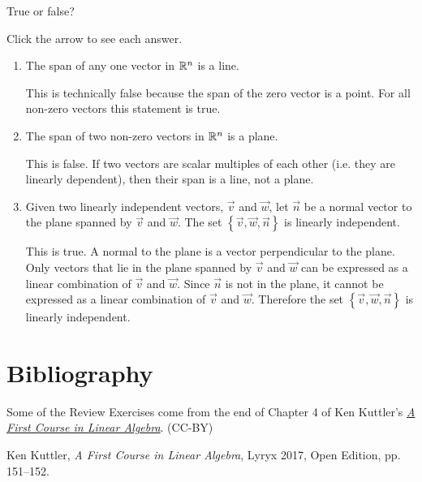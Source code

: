 \documentclass{ximera}
\begin{document}
\begin{problem}\label{prob:solvedCh2_3}
    True or false?

    Click the arrow to see each answer.

    \begin{enumerate}
        \item The span of any one vector in $\mathbb{R}^n$ is a line.

        \begin{expandable}
            This is technically false because the span of the zero vector is a point.  For all non-zero vectors this statement is true.
        \end{expandable}

        \item The span of two non-zero vectors in $\mathbb{R}^n$ is a plane.

        \begin{expandable}
            This is false.  If two vectors are scalar multiples of each other (i.e. they are linearly dependent), then their span is a line, not a plane.
        \end{expandable}

        \item Given two linearly independent vectors, $\vec{v}$ and $\vec{w}$, let $\vec{n}$ be a normal vector to the plane spanned by $\vec{v}$ and $\vec{w}$.  The set $\left\{\vec{v}, \vec{w}, \vec{n}\right\}$ is linearly independent.

        \begin{expandable}
            This is true.  A normal to the plane is a vector perpendicular to the plane.  Only vectors that lie in the plane spanned by $\vec{v}$ and $\vec{w}$ can be expressed as a linear combination of $\vec{v}$ and $\vec{w}$.  Since $\vec{n}$ is not in the plane, it cannot be expressed as a linear combination of $\vec{v}$ and $\vec{w}$.  Therefore the set $\left\{\vec{v}, \vec{w}, \vec{n}\right\}$ is linearly independent.
        \end{expandable}
    \end{enumerate}
\end{problem}

\section*{Bibliography}
Some of the Review Exercises come from the end of Chapter 4 of Ken Kuttler's \href{https://open.umn.edu/opentextbooks/textbooks/a-first-course-in-linear-algebra-2017}{\it A First Course in Linear Algebra}. (CC-BY)

Ken Kuttler, {\it  A First Course in Linear Algebra}, Lyryx 2017, Open Edition, pp. 151--152.
\end{document}
